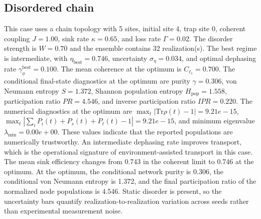 \subsection{Disordered chain}
This case uses a chain topology with 5 sites, initial site 4, trap site 0, coherent coupling $J=1.00$, sink rate $\kappa=0.65$, and loss rate $\Gamma=0.02$. The disorder strength is $W=0.70$ and the ensemble contains 32 realization(s).
The best regime is intermediate, with $\eta_{\mathrm{best}}=0.746$, uncertainty $\sigma_\eta=0.034$, and optimal dephasing rate $\gamma_\phi^{\mathrm{best}}=0.100$. The mean coherence at the optimum is $C_{\ell_1}=0.700$.
The conditional final-state diagnostics at the optimum are purity $\gamma=0.306$, von Neumann entropy $S=1.372$, Shannon population entropy $H_\mathrm{pop}=1.558$, participation ratio $PR=4.546$, and inverse participation ratio $IPR=0.220$.
The numerical diagnostics at the optimum are $\max_t |\mathrm{Tr}\rho(t)-1|=9.21e-15$, $\max_t |\sum_i P_i(t)+P_s(t)+P_\ell(t)-1|=9.21e-15$, and minimum eigenvalue $\lambda_\mathrm{min}=0.00e+00$. These values indicate that the reported populations are numerically trustworthy.
An intermediate dephasing rate improves transport, which is the operational signature of environment-assisted transport in this case. The mean sink efficiency changes from 0.743 in the coherent limit to 0.746 at the optimum. At the optimum, the conditional network purity is 0.306, the conditional von Neumann entropy is 1.372, and the final participation ratio of the normalized node populations is 4.546. Static disorder is present, so the uncertainty bars quantify realization-to-realization variation across seeds rather than experimental measurement noise.

